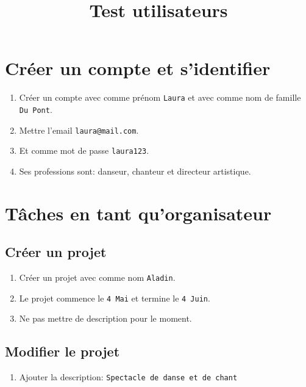 \documentclass[11pt]{article}
\author{}
\begin{document}
\pagestyle{fancy}
\fancyhead{}


\title{\vspace{-1cm}\huge{Test utilisateurs}\vspace{-1.7cm}}
\date{}
\maketitle
\thispagestyle{fancy}
\section{Créer un compte et s'identifier}
\begin{enumerate}
    \item Créer un compte avec comme prénom \texttt{Laura} et avec comme nom de famille \texttt{Du Pont}.
    \item Mettre l'email \texttt{laura@mail.com}.
    \item Et comme mot de passe \texttt{laura123}.
    \item Ses professions sont: danseur, chanteur et directeur artistique.
\end{enumerate}
\section{Tâches en tant qu'organisateur}
\subsection{Créer un projet}
\begin{enumerate}
    \item Créer un projet avec comme nom \texttt{Aladin}.
    \item Le projet commence le \texttt{4 Mai} et termine le \texttt{4 Juin}.
    \item Ne pas mettre de description pour le moment.
\end{enumerate}
\subsection{Modifier le projet}
\begin{enumerate}
    \item Ajouter la description: \texttt{Spectacle de danse et de chant}
\end{enumerate}
\end{document}
